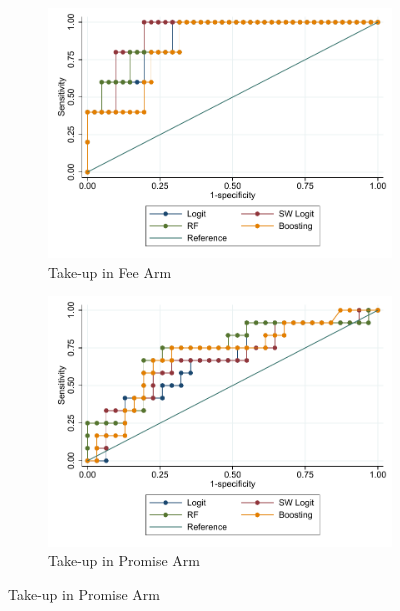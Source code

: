 \documentclass[oneside,11pt]{article}
\begin{document}
\vspace{.1in}
\begin{figure}[H]
    \caption{Out of sample ROC curve}
    \label{roc_curve}
    \begin{center}
    \begin{subfigure}{0.45\textwidth}
        \caption{Take-up in Fee Arm}
        \centering
        \includegraphics[width=\textwidth]{Figuras/Boost/ROC_curve_outsample_pago_frec_vol_fee.pdf}
    \end{subfigure}
    \begin{subfigure}{0.45\textwidth}
        \caption{Take-up in Promise Arm}
        \centering
        \includegraphics[width=\textwidth]{Figuras/Boost/ROC_curve_outsample_pago_frec_vol_promise.pdf}
    \end{subfigure}
    \end{center}
     \scriptsize 
\end{figure}
\end{document}
